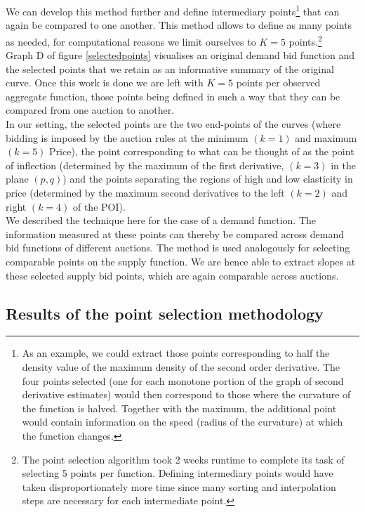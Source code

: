 We can develop this method further and define intermediary points\footnote{As an example, we could extract those points corresponding to half the density value of the maximum density of the second order derivative. The four points selected (one for each monotone portion of the graph of second derivative estimates) would then correspond to those where the curvature of the function is halved. Together with the maximum, the additional point would contain information on the speed (radius of the curvature) at which the function changes.} that can again be compared to one another. This method allows to define as many points as needed, for computational reasons we limit ourselves to $K=5$ points.\footnote{The point selection algorithm took 2 weeks runtime to complete its task of selecting 5 points per function. Defining intermediary points would have taken disproportionately more time since many sorting and interpolation steps are necessary for each intermediate point.} \\

Graph D of figure \ref{selectedpoints} visualises an original demand bid function and the selected points that we retain as an informative summary of the original curve. Once this work is done we are left with $K=5$ points per observed aggregate function, those points being defined in such a way that they can be compared from one auction to another. \\

In our setting, the selected points are the two end-points of the curves (where bidding is imposed by the auction rules at the minimum $(k=1)$ and maximum $(k=5)$ Price), the point corresponding to what can be thought of as the point of inflection (determined by the maximum of the first derivative, $(k=3)$ in the plane $(p,q)$) and the points separating the regions of high and low elasticity in price (determined by the maximum second derivatives to the left $(k=2)$ and right $(k=4)$ of the POI). \\

We described the technique here for the case of a demand function. The information measured at these points can thereby be compared across demand bid functions of different auctions. The method is used analogously for selecting comparable points on the supply function. We are hence able to extract slopes at these selected supply bid points, which are again comparable across auctions.\\


\subsection{Results of the point selection methodology}
\label{pointresults}


